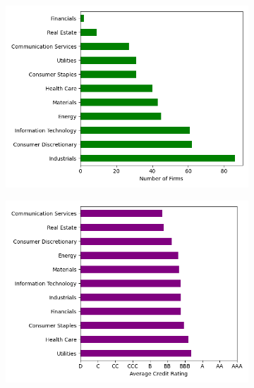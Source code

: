 \documentclass{article}[11pt]
\begin{document}
    \begin{figure}
        \caption{Sector}
        \begin{subfigure}[h]{0.4925\textwidth}
            \centering
            \includegraphics[width=0.95\hsize]{../Output/All Data EDA/Tabular EDA/all_data_fixed_quarter_dates_firms_by_sector_no_title.png}
        \end{subfigure}
        \begin{subfigure}[h]{0.4925\textwidth}
            \centering
            \includegraphics[width=0.95\hsize]{../Output/All Data EDA/Tabular EDA/all_data_fixed_quarter_dates_average_credit_rating_by_sector_no_title.png}
        \end{subfigure}
        \hfill
        \label{fig:firms-by-sector}
    \end{figure}
\end{document}
